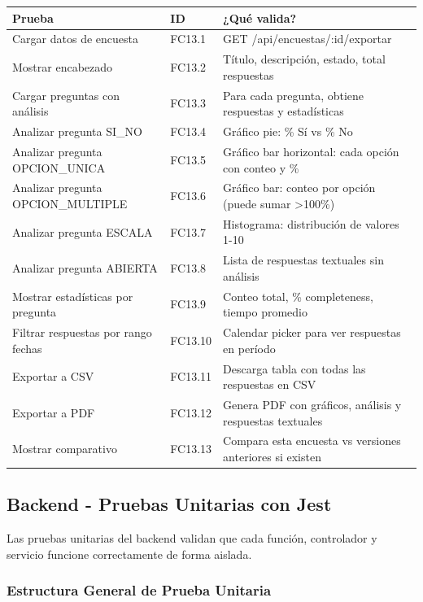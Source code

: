 \begin{table}[H]
\centering
\begin{tabular}{|l|l|p{6cm}|}
\hline
\textbf{Prueba} & \textbf{ID} & \textbf{¿Qué valida?} \\ \hline
Cargar datos de encuesta & FC13.1 & GET /api/encuestas/:id/exportar \\ \hline
Mostrar encabezado & FC13.2 & Título, descripción, estado, total respuestas \\ \hline
Cargar preguntas con análisis & FC13.3 & Para cada pregunta, obtiene respuestas y estadísticas \\ \hline
Analizar pregunta SI\_NO & FC13.4 & Gráfico pie: \% Sí vs \% No \\ \hline
Analizar pregunta OPCION\_UNICA & FC13.5 & Gráfico bar horizontal: cada opción con conteo y \% \\ \hline
Analizar pregunta OPCION\_MULTIPLE & FC13.6 & Gráfico bar: conteo por opción (puede sumar >100\%) \\ \hline
Analizar pregunta ESCALA & FC13.7 & Histograma: distribución de valores 1-10 \\ \hline
Analizar pregunta ABIERTA & FC13.8 & Lista de respuestas textuales sin análisis \\ \hline
Mostrar estadísticas por pregunta & FC13.9 & Conteo total, \% completeness, tiempo promedio \\ \hline
Filtrar respuestas por rango fechas & FC13.10 & Calendar picker para ver respuestas en período \\ \hline
Exportar a CSV & FC13.11 & Descarga tabla con todas las respuestas en CSV \\ \hline
Exportar a PDF & FC13.12 & Genera PDF con gráficos, análisis y respuestas textuales \\ \hline
Mostrar comparativo & FC13.13 & Compara esta encuesta vs versiones anteriores si existen \\ \hline
\end{tabular}
\end{table}

\subsection{Backend - Pruebas Unitarias con Jest}

Las pruebas unitarias del backend validan que cada función, controlador y servicio funcione correctamente de forma aislada.

\subsubsection{Estructura General de Prueba Unitaria}

